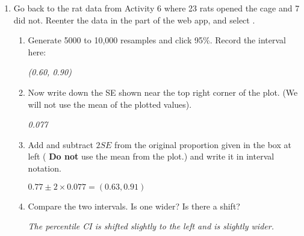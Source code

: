 \begin{enumerate}
\item Go back to the rat data from Activity 6 where 23 rats opened the
  cage and 7 did not.  Reenter the data in the  part
  of the web app, and select . 
  \begin{enumerate}
  \item Generate 5000 to 10,000 resamples and click 95\%. Record the
    interval here:
\begin{students}
\vspace{1.5cm}
\end{students}

\begin{key}
  {\em (0.60, 0.90)}
\end{key}
\item Now write down the SE shown near the top right corner of the
  plot.  (We will not use the mean of the plotted values).
\begin{students}
\vspace{1.5cm}
\end{students}

\begin{key}
  {\em 0.077}
\end{key}
\item Add and subtract $2SE$ from the original proportion given in the
  box at left ( {\bf Do not} use the mean from the plot.) and write it
  in interval notation.

\begin{students}
\vspace{1.5cm}
\end{students}

\begin{key}
  {$ 0.77 \pm 2\times 0.077 =  (0.63, 0.91)$}
\end{key}
\item Compare the two intervals.  Is one wider? Is there a shift?

\begin{students}
\vspace{1.5cm}
\end{students}

\begin{key}
  {\em The percentile CI is shifted slightly to the left and is
    slightly wider.}
\end{key}

  \end{enumerate}
\end{enumerate}
